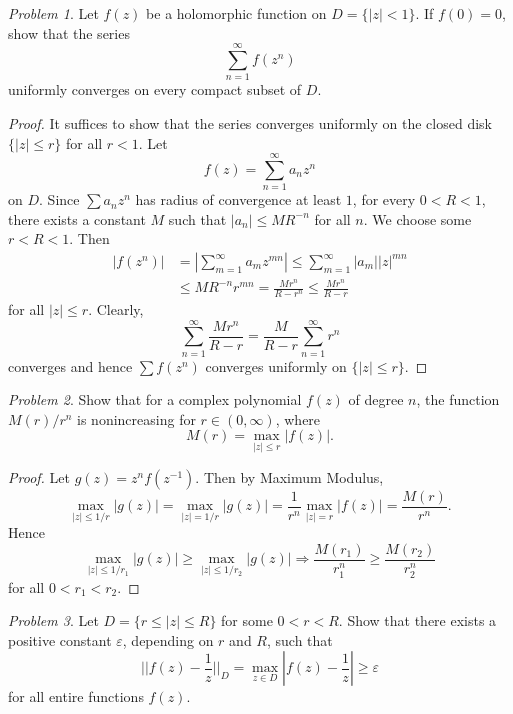 \documentclass[11pt]{amsart}
\theoremstyle{remark}
\newtheorem{prob}{Problem}[section]
\theoremstyle{definition}
\numberwithin{equation}{section}
\begin{document}
\begin{prob}
    Let $f(z)$ be a holomorphic function on $D=\{|z| < 1\}$.
    If $f(0) = 0$, show that the series
    \[
        \sum_{n=1}^\infty f(z^n)
    \]
    uniformly converges on every compact subset of $D$.
\end{prob}

\begin{proof}
    It suffices to show that the series converges uniformly on the closed disk $\{|z|\le r\}$ for all $r < 1$. Let
    \[
        f(z) = \sum_{n=1}^\infty a_n z^n
    \]
    on $D$. Since $\sum a_n z^n$ has radius of convergence at least $1$, for every $0 < R < 1$, there exists a constant $M$ such that $|a_n| \le M R^{-n}$ for all $n$. We choose
    some $r < R < 1$. Then
    \[
        \begin{aligned}
            |f(z^n)| & = \left|\sum_{m=1}^\infty  a_m z^{mn}\right| \le \sum_{m=1}^\infty |a_m| |z|^{mn} \\
                     & \le MR^{-n} r^{mn} = \frac{M r^n}{R - r^n} \le \frac{Mr^n}{R-r}
        \end{aligned}
    \]
    for all $|z|\le r$. Clearly,
    \[
        \sum_{n=1}^\infty \frac{Mr^n}{R-r} = \frac{M}{R-r} \sum_{n=1}^\infty r^n
    \]
    converges and hence $\sum f(z^n)$ converges uniformly on $\{|z|\le r\}$.
\end{proof}

\begin{prob}
    Show that for a complex polynomial $f(z)$ of degree $n$, the function
    $M(r)/r^n$ is nonincreasing for $r\in (0,\infty)$, where
    \[
        M(r) = \max_{|z| \le r} |f(z)|.
    \]
\end{prob}

\begin{proof}
    Let $g(z) = z^n f(z^{-1})$. Then by Maximum Modulus,
    \[
        \max_{|z| \le 1/r} |g(z)| = \max_{|z| = 1/r} |g(z)| = \frac{1}{r^n}
        \max_{|z| = r} |f(z)| = \frac{M(r)}{r^n}.
    \]
    Hence
    \[
        \max_{|z| \le 1/r_1} |g(z)| \ge \max_{|z| \le 1/r_2} |g(z)|
        \Rightarrow \frac{M(r_1)}{r_1^n}\ge \frac{M(r_2)}{r_2^n}
    \]
    for all $0 < r_1 < r_2$.
\end{proof}

\begin{prob}
    Let $D = \{r\le |z|\le R\}$ for some $0<r<R$. Show that there exists a positive constant $\varepsilon$, depending on $r$ and $R$, such that
    \[
        \Big|\Big| f(z) - \frac{1}{z} \Big|\Big|_D = \max_{z\in D} \left|f(z) - \frac{1}z\right| \ge \varepsilon
    \]
    for all entire functions $f(z)$.
\end{prob}
\end{document}
